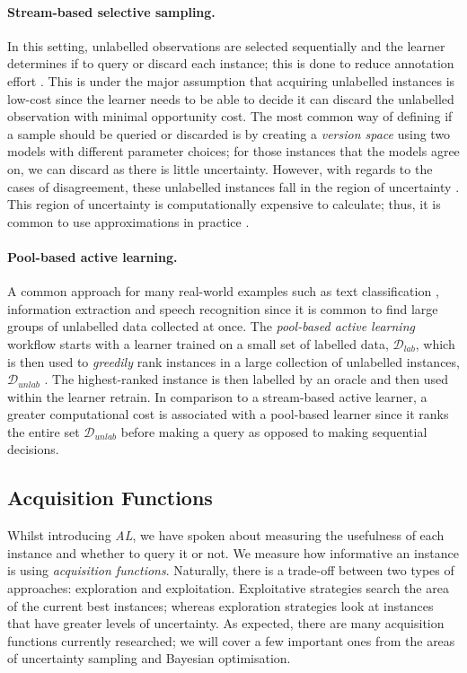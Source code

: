 \paragraph{Stream-based selective sampling.} In this setting, unlabelled observations are selected sequentially and the learner determines if to query or discard each instance; this is done to reduce annotation effort \cite{Cohn94}. This is under the major assumption that acquiring unlabelled instances is low-cost since the learner needs to be able to decide it can discard the unlabelled observation with minimal opportunity cost. The most common way of defining if a sample should be queried or discarded is by creating a \emph{version space} \cite{Mitchell82} using two models with different parameter choices; for those instances that the models agree on, we can discard as there is little uncertainty. However, with regards to the cases of disagreement, these unlabelled instances fall in the region of uncertainty \cite{Settles09}. This region of uncertainty is computationally expensive to calculate; thus, it is common to use approximations in practice \cite{Seung92, Cohn94, Dasgupta07}.

\paragraph{Pool-based active learning.} A common approach for many real-world examples such as text classification \cite{Lewis94}, information extraction \cite{Thompson99} and speech recognition \cite{Tur05} since it is common to find large groups of unlabelled data collected at once. The \emph{pool-based active learning} workflow starts with a learner trained on a small set of labelled data, $ \mathcal{D}_{lab} $, which is then used to \emph{greedily} rank instances in a large collection of unlabelled instances, $\mathcal{D}_{unlab} $ \cite{Lewis94}. The highest-ranked instance is then labelled by an oracle and then used within the learner retrain. In comparison to a stream-based active learner, a greater computational cost is associated with a pool-based learner since it ranks the entire set $\mathcal{D}_{unlab}$ before making a query as opposed to making sequential decisions.
	
\subsection{Acquisition Functions}
\label{chap:literaturereview:active:acquisition}

Whilst introducing \emph{AL}, we have spoken about measuring the usefulness of each instance and whether to query it or not. We measure how informative an instance is using \emph{acquisition functions}. Naturally, there is a trade-off between two types of approaches: exploration and exploitation. Exploitative strategies search the area of the current best instances; whereas exploration strategies look at instances that have greater levels of uncertainty. As expected, there are many acquisition functions currently researched; we will cover a few important ones from the areas of uncertainty sampling and Bayesian optimisation.

